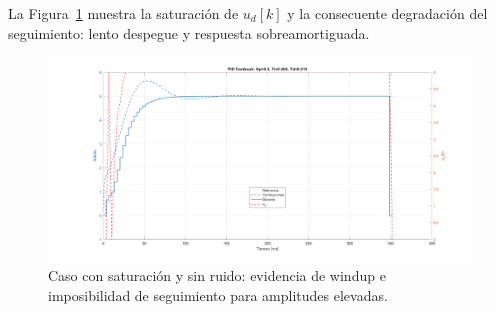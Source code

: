 La Figura~\ref{fig:windup} muestra la saturación de \(u_d[k]\) y la consecuente degradación del seguimiento: lento despegue y respuesta sobreamortiguada.

\begin{figure}[!t]
	\centering
	\includegraphics[width=\columnwidth]{img/windup.png}%
	\caption{Caso con saturación y sin ruido: evidencia de windup e imposibilidad de seguimiento para amplitudes elevadas.}
	\label{fig:windup}
\end{figure}
